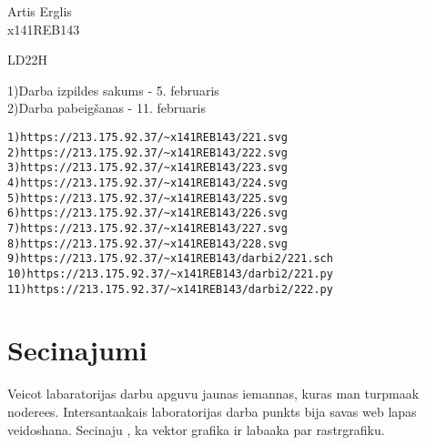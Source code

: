 \documentclass[a4,12Pt]{article}
\begin{document}
\begin{flushright}
Artis Erglis\\
x141REB143\\
\end{flushright}

\begin{center}
\large LD22H
\end{center}

\begin{flushleft}
1)Darba izpildes sakums - 5. februaris\\
2)Darba pabeigšanas - 11. februaris
\end{flushleft}

\begin{verbatim}
1)https://213.175.92.37/~x141REB143/221.svg
2)https://213.175.92.37/~x141REB143/222.svg
3)https://213.175.92.37/~x141REB143/223.svg
4)https://213.175.92.37/~x141REB143/224.svg
5)https://213.175.92.37/~x141REB143/225.svg
6)https://213.175.92.37/~x141REB143/226.svg
7)https://213.175.92.37/~x141REB143/227.svg
8)https://213.175.92.37/~x141REB143/228.svg
9)https://213.175.92.37/~x141REB143/darbi2/221.sch
10)https://213.175.92.37/~x141REB143/darbi2/221.py
11)https://213.175.92.37/~x141REB143/darbi2/222.py

\end{verbatim}

\section{Secinajumi}
\begin{flushleft}
Veicot labaratorijas darbu apguvu jaunas iemannas, kuras man turpmaak noderees. Intersantaakais laboratorijas darba punkts bija savas web lapas veidoshana.
Secinaju , ka vektor grafika ir labaaka par rastrgrafiku.
\end{flushleft}
\end{document}
